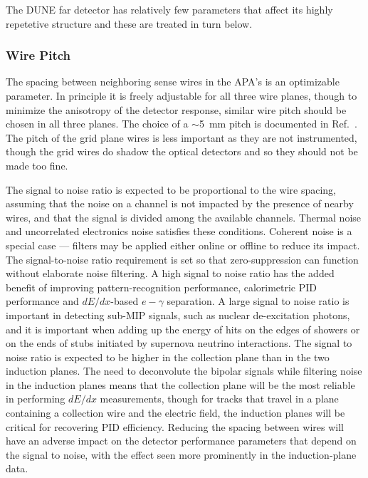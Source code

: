 The DUNE far detector has relatively few parameters that affect its highly repetetive
structure and these are treated in turn below.

\subsubsection{Wire Pitch}

The spacing between neighboring sense wires in the APA's is an optimizable parameter.  In principle
it is freely adjustable for all three wire planes, though to minimize the anisotropy of the
detector response, similar wire pitch should be chosen in all three planes.  The choice of
a $\sim$5~mm pitch is documented in Ref.~\cite{docdb-3407}.  The pitch of the
grid plane wires is less important as they are not instrumented,
though the grid wires do shadow the optical detectors and so
they should not be made too fine.

The signal to noise ratio is expected to be proportional to the wire
spacing, assuming that the noise on a channel is not impacted by the
presence of nearby wires, and that the signal is divided among the
available channels.  Thermal noise and uncorrelated electronics noise
satisfies these conditions.  Coherent noise is a special case ---
filters may be applied either online or offline to reduce its impact.
The signal-to-noise ratio requirement is set so that zero-suppression
can function without elaborate noise filtering.  A high signal to
noise ratio has the added benefit of improving pattern-recognition
performance, calorimetric PID performance and $dE/dx$-based
$e-\gamma$ separation.  A large signal to noise ratio is important in
detecting sub-MIP signals, such as nuclear de-excitation photons, and
it is important when adding up the energy of hits on the edges of
showers or on the ends of stubs initiated by supernova neutrino
interactions.  The signal to noise ratio is expected to be higher in
the collection plane than in the two induction planes.  The need to
deconvolute the bipolar signals while filtering noise in the induction
planes means that the collection plane will be the most reliable in
performing $dE/dx$ measurements, though for tracks that travel in a
plane containing a collection wire and the electric field, the
induction planes will be critical for recovering PID efficiency.
Reducing the spacing between wires will have an adverse impact on the
detector performance parameters that depend on the signal to noise,
with the effect seen more prominently in the induction-plane data.

